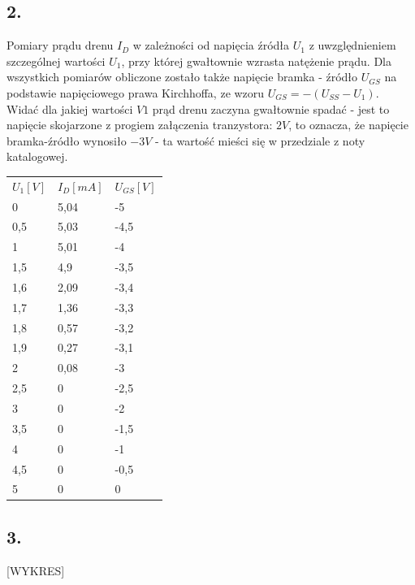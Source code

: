 \documentclass[polish,a4paper]{article}
\begin{document}
\subsection*{2.}

Pomiary prądu drenu $I_D$ w zależności od napięcia źródła $U_{1}$ z uwzględnieniem szczególnej wartości $U_{1}$, przy której gwałtownie wzrasta natężenie prądu. Dla wszystkich pomiarów obliczone zostało także napięcie bramka - źródło $U_{GS}$ na podstawie napięciowego prawa Kirchhoffa, ze wzoru $U_{GS}=-(U_{SS}-U_1)$.\\
Widać dla jakiej wartości $V1$ prąd drenu zaczyna gwałtownie spadać - jest to napięcie skojarzone z progiem załączenia tranzystora: $2V$, to oznacza, że napięcie bramka-źródło wynosiło $-3V$ - ta wartość mieści się w przedziale z noty katalogowej.

\begin{center}
\begin{tabular}{|l|l|l|}
\hline
\textbf{$U_1 [V]$} & \textbf{$I_D [mA]$} & \textbf{$U_{GS} [V]$}\\
\hhline{|=|=|=|}
0 & 5,04 & -5\\
\hline
0,5 & 5,03 & -4,5\\
\hline
1 & 5,01 & -4\\
\hline
1,5 & 4,9 & -3,5\\
\hline
1,6 & 2,09 & -3,4\\
\hline
1,7 & 1,36 & -3,3\\
\hline
1,8 & 0,57 & -3,2\\
\hline
1,9 & 0,27 & -3,1\\
\hline
2 & 0,08 & -3\\
\hline
2,5 & 0 & -2,5\\
\hline
3 & 0 & -2\\
\hline
3,5 & 0 & -1,5\\
\hline
4 & 0 & -1\\
\hline
4,5 & 0 & -0,5\\
\hline
5 & 0 & 0\\
\hline

\end{tabular}
\end{center}


\subsection*{3.} 
[WYKRES]
\end{document}
